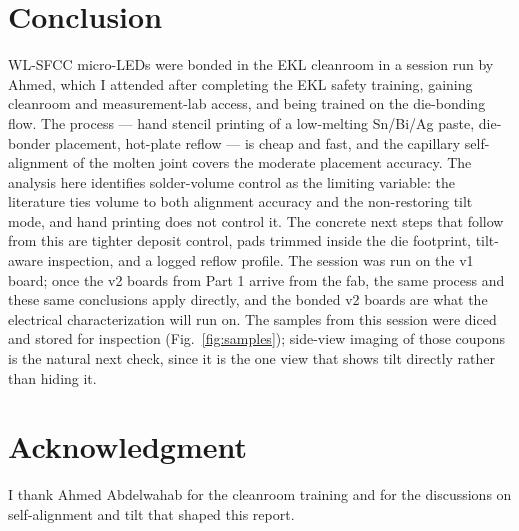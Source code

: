 \documentclass[conference]{IEEEtran}
\begin{document}
\section{Conclusion}

WL-SFCC micro-LEDs were bonded in the EKL cleanroom in a session run by
Ahmed, which I attended after completing the EKL safety training, gaining
cleanroom and measurement-lab access, and being trained on the die-bonding
flow. The process — hand stencil printing of a low-melting Sn/Bi/Ag paste,
die-bonder placement, hot-plate reflow — is cheap and fast, and the
capillary self-alignment of the molten joint covers the moderate placement
accuracy. The analysis here identifies solder-volume control as the
limiting variable: the literature ties volume to both alignment accuracy
and the non-restoring tilt mode, and hand printing does not control it. The
concrete next steps that follow from this are tighter deposit control, pads
trimmed inside the die footprint, tilt-aware inspection, and a logged
reflow profile. The session was run on the v1 board; once the v2 boards
from Part 1 arrive from the fab, the same process and these same
conclusions apply directly, and the bonded v2 boards are what the
electrical characterization will run on. The samples from this session were
diced and stored for inspection (Fig.~\ref{fig:samples}); side-view imaging
of those coupons is the natural next check, since it is the one view that
shows tilt directly rather than hiding it.

\section*{Acknowledgment}

I thank Ahmed Abdelwahab for the cleanroom training and for the
discussions on self-alignment and tilt that shaped this report.



\end{document}
